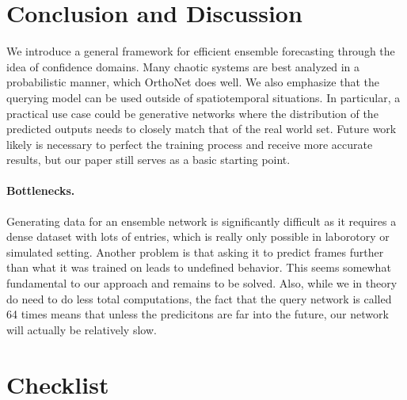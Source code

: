 \documentclass{article}
\begin{document}
    \section{Conclusion and Discussion}

    We introduce a general framework for efficient ensemble forecasting through the idea of confidence domains. Many chaotic systems are best analyzed in a probabilistic manner, which OrthoNet does well. We also emphasize that the querying model can be used outside of spatiotemporal situations. In particular, a practical use case could be generative networks where the distribution of the predicted outputs needs to closely match that of the real world set. Future work likely is necessary to perfect the training process and receive more accurate results, but our paper still serves as a basic starting point.

    \paragraph{Bottlenecks.} Generating data for an ensemble network is significantly difficult as it requires a dense dataset with lots of entries, which is really only possible in laborotory or simulated setting. Another problem is that asking it to predict frames further than what it was trained on leads to undefined behavior. This seems somewhat fundamental to our approach and remains to be solved. Also, while we in theory do need to do less total computations, the fact that the query network is called 64 times means that unless the predicitons are far into the future, our network will actually be relatively slow.

    

    \section*{Checklist}
\end{document}
